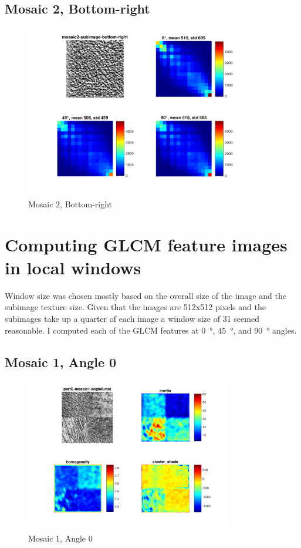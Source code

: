 \documentclass[a4paper,12pt,titlepage]{article}
\begin{document}
\subsection{Mosaic 2, Bottom-right}
\begin{figure}[H]
\includegraphics[width=0.9\textwidth]{partB-mosaic2-subimage-bottom-right}
\caption{Mosaic 2, Bottom-right}
\label{fig:Mosaic2SubimageBottomRight}
\end{figure}

\section{Computing GLCM feature images in local windows}

Window size was chosen mostly based on the overall size of the image and the subimage texture size. Given that the images are 512x512 pixels and the subimages take up a quarter of each image a window size of 31 seemed reasonable. I computed each of the GLCM features at \SI{0}{\degree}, \SI{45}{\degree}, and \SI{90}{\degree} angles.

\subsection{Mosaic 1, Angle 0}
\begin{figure}[H]
\includegraphics[width=0.8\textwidth]{partC-mosaic1-angle0}
\caption{Mosaic 1, Angle 0}
\label{fig:Mosaic1Angle0}
\end{figure}
\end{document}
